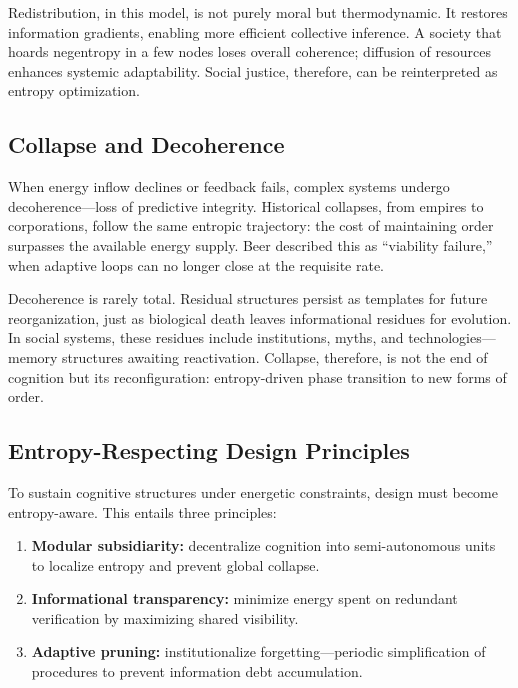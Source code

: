 \documentclass[11pt,a4paper]{article}
\begin{document}
Redistribution, in this model, is not purely moral but thermodynamic.  It restores information gradients, enabling more efficient collective inference.  A society that hoards negentropy in a few nodes loses overall coherence; diffusion of resources enhances systemic adaptability.  Social justice, therefore, can be reinterpreted as entropy optimization.

\subsection{Collapse and Decoherence}

When energy inflow declines or feedback fails, complex systems undergo decoherence—loss of predictive integrity.  Historical collapses, from empires to corporations, follow the same entropic trajectory: the cost of maintaining order surpasses the available energy supply.  Beer \citep{Beer1979BrainOfFirm} described this as “viability failure,” when adaptive loops can no longer close at the requisite rate.

Decoherence is rarely total.  Residual structures persist as templates for future reorganization, just as biological death leaves informational residues for evolution.  In social systems, these residues include institutions, myths, and technologies—memory structures awaiting reactivation.  Collapse, therefore, is not the end of cognition but its reconfiguration: entropy-driven phase transition to new forms of order.

\subsection{Entropy-Respecting Design Principles}

To sustain cognitive structures under energetic constraints, design must become entropy-aware.  This entails three principles:

\begin{enumerate}
    \item \textbf{Modular subsidiarity:} decentralize cognition into semi-autonomous units to localize entropy and prevent global collapse.
    \item \textbf{Informational transparency:} minimize energy spent on redundant verification by maximizing shared visibility.
    \item \textbf{Adaptive pruning:} institutionalize forgetting—periodic simplification of procedures to prevent information debt accumulation.
\end{enumerate}
\end{document}
